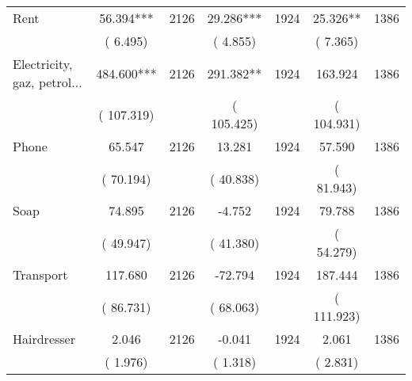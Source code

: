 \begin{tabular}{l*{6}{c}}
Rent        &             56.394***      &       2126       &             29.286***      &       1924       &             25.326**      &       1386       \\
                       &       (       6.495)            &                               &       (       4.855)            &                               &       (       7.365)            &                               \\
Electricity, gaz, petrol...        &            484.600***      &       2126       &            291.382**      &       1924       &            163.924      &       1386       \\
                       &       (     107.319)            &                               &       (     105.425)            &                               &       (     104.931)            &                               \\
Phone        &             65.547      &       2126       &             13.281      &       1924       &             57.590      &       1386       \\
                       &       (      70.194)            &                               &       (      40.838)            &                               &       (      81.943)            &                               \\
Soap        &             74.895      &       2126       &             -4.752      &       1924       &             79.788      &       1386       \\
                       &       (      49.947)            &                               &       (      41.380)            &                               &       (      54.279)            &                               \\
Transport        &            117.680      &       2126       &            -72.794      &       1924       &            187.444      &       1386       \\
                       &       (      86.731)            &                               &       (      68.063)            &                               &       (     111.923)            &                               \\
Hairdresser        &              2.046      &       2126       &             -0.041      &       1924       &              2.061      &       1386       \\
                       &       (       1.976)            &                               &       (       1.318)            &                               &       (       2.831)            &                               \\

\end{tabular}
